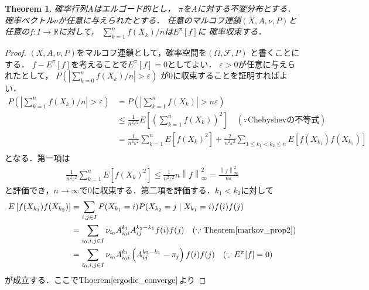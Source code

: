 \documentclass[dvipdfmx,autodetect-engine]{jsarticle}
\newtheorem{theorem}{Theorem}[section]
\theoremstyle{remark}
\theoremstyle{definition}
\newcommand{\R}{\mathbb{R}}
\newcommand{\abs}[1]{\left\lvert#1\right\rvert}%
\newcommand{\norm}[1]{\left\lVert#1\right\rVert}%
\begin{document}
\begin{theorem}
    確率行列$A$はエルゴード的とし，
    $\pi$を$A$に対する不変分布とする．
    確率ベクトル$\nu$が任意に与えられたとする．
    任意のマルコフ連鎖$(X,A,\nu,P)$と
    任意の$f \colon I \to \R$に対して，
    $\sum_{k=1}^{n}f(X_{k})/n$は$E^{\pi}[f]$に
    確率収束する．
\end{theorem}


\begin{proof}
    $(X,A,\nu,P)$をマルコフ連鎖として，確率空間を$(\Omega,\mathcal{F},P)$
    と書くことにする．
    $f - E^{\pi}[f]$を考えることで$E^{\pi}[f]=0$としてよい．
    $\varepsilon >0$が任意に与えられたとして，
    $P\left(\abs{\sum_{k=0}^{n}f(X_{k})/n}>\varepsilon\right)$
    が$0$に収束することを証明すればよい．
    \begin{align}
        P\left(\abs{\sum_{k=1}^{n}f(X_{k})/n}>\varepsilon\right)
        &= P\left(\abs{\sum_{k=1}^{n}f(X_{k})} > n\varepsilon \right)\\
        &\leq \frac{1}{n^{2}\varepsilon^{2}} 
        E\left[\left(\sum_{k=1}^{n} f(X_{k})\right)^{2}\right] 
        \quad (\because \text{Chebyshevの不等式})\\
        &= \frac{1}{n^{2}\varepsilon^{2}} \sum_{k=1}^{n} E\left[f(X_{k})^2 \right]
        + \frac{2}{n^{2}\varepsilon^{2}} \sum_{1\leq k_1 < k_2 \leq n} 
        E\left[f(X_{k_1})f(X_{k_2})\right] \\
    \end{align}
    となる．第一項は
    \begin{align}
        \frac{1}{n^{2}\varepsilon^{2}} \sum_{k=1}^{n} E\left[f(X_{k})^2 \right] 
        \leq \frac{1}{n^{2}\varepsilon^{2}} n\norm{f}_{\infty}^{2} 
        = \frac{\norm{f}_{\infty}^{2}}{n\varepsilon}
    \end{align}
    と評価でき，$n \to \infty$で$0$に収束する．第二項を評価する．$k_1 < k_2$に対して
    \begin{align}
        E\left[f(X_{k_1})f(X_{k_2})\right] 
        &= \sum_{i,j\in I} P(X_{k_1}=i)P(X_{k_2}=j\mid X_{k_1}=i)f(i)f(j)\\
        &= \sum_{i_0,i,j \in I} \nu_{i_0} A_{i_0 i}^{k_1} A_{ij}^{k_2 - k_1} f(i)f(j)
        \quad (\because \mathrm{Theorem}\ref{markov_prop2}) \\
        &= \sum_{i_0,i,j \in I} \nu_{i_0} A_{i_0 i}^{k_1} 
        \left(A_{ij}^{k_2 - k_1} - \pi_{j}\right)  f(i)f(j)
        \quad (\because E^{\pi}[f]=0)
    \end{align}
    が成立する．ここで$\mathrm{Thoerem}\ref{ergodic_converge}$より

\end{proof}
\end{document}
